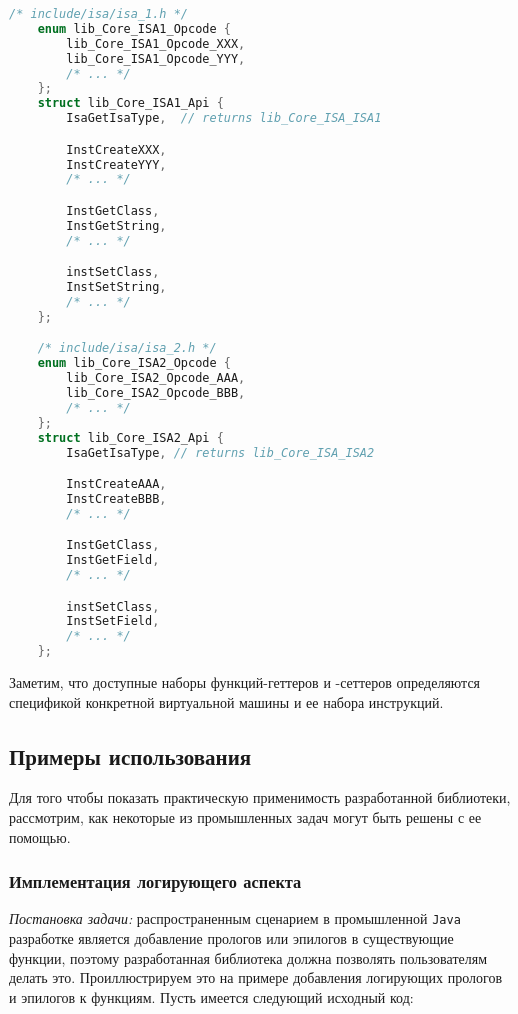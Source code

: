 \begin{lstlisting}[language=C, label=lst:libIsaApi]
    /* include/isa/isa_1.h */
    enum lib_Core_ISA1_Opcode {
        lib_Core_ISA1_Opcode_XXX,
        lib_Core_ISA1_Opcode_YYY,
        /* ... */
    };
    struct lib_Core_ISA1_Api {
        IsaGetIsaType,  // returns lib_Core_ISA_ISA1

        InstCreateXXX,
        InstCreateYYY,
        /* ... */

        InstGetClass,
        InstGetString,
        /* ... */

        instSetClass,
        InstSetString,
        /* ... */
    };

    /* include/isa/isa_2.h */
    enum lib_Core_ISA2_Opcode {
        lib_Core_ISA2_Opcode_AAA,
        lib_Core_ISA2_Opcode_BBB,
        /* ... */
    };
    struct lib_Core_ISA2_Api {
        IsaGetIsaType, // returns lib_Core_ISA_ISA2

        InstCreateAAA,
        InstCreateBBB,
        /* ... */

        InstGetClass,
        InstGetField,
        /* ... */

        instSetClass,
        InstSetField,
        /* ... */
    };
\end{lstlisting}

Заметим, что доступные наборы функций-геттеров и -сеттеров определяются спецификой конкретной виртуальной машины и ее набора инструкций.

\subsection{Примеры использования}

Для того чтобы показать практическую применимость разработанной библиотеки, рассмотрим, как некоторые из промышленных задач могут быть решены с ее помощью.

\subsubsection{Имплементация логирующего аспекта}

\textit{Постановка задачи:} распространенным сценарием в промышленной \texttt{Java} разработке является добавление прологов или эпилогов в существующие функции, поэтому разработанная библиотека должна позволять пользователям делать это. Проиллюстрируем это на примере добавления логирующих прологов и эпилогов к функциям. Пусть имеется следующий исходный код:

